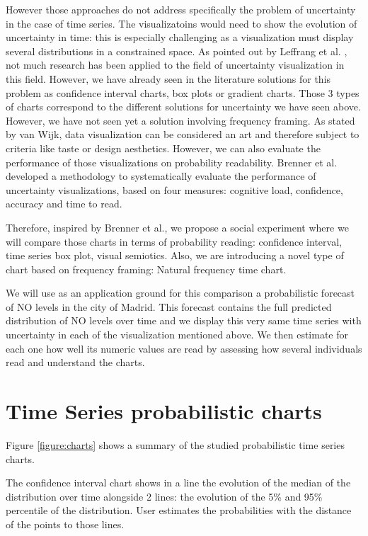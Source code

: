 \documentclass[a4paper,3p,sort&compress]{elsarticle}
\begin{document}
However those approaches do not address specifically the problem of uncertainty in the case of time series.
The visualizatoins would need to show the evolution of uncertainty in time: this 
is especially challenging as a visualization must display several distributions in a constrained space.  
As pointed out by Leffrang et al. \cite{leffrang_should_2021}, not much research has been applied to the 
field of uncertainty visualization in this field. 
However, we have already seen in the literature solutions for this problem as confidence interval charts,
 box plots or gradient charts. Those 3 types of charts correspond to the different solutions for uncertainty 
 we have seen above. However, we have not seen yet a solution involving frequency framing. As stated by van Wijk,
 data visualization can be considered an art and therefore subject to criteria like taste or design aesthetics. 
However, we can also evaluate the performance of those visualizations on probability readability.
Brenner et al. \cite{brennen_instrument_2018} developed a methodology to systematically evaluate the performance
of uncertainty visualizations, based on four measures: cognitive load, confidence, accuracy and time to read. 

Therefore, inspired by Brenner et al., we propose a social experiment where we will compare those charts 
in terms of probability reading: confidence interval, time series box plot, visual semiotics.
Also, we are introducing a novel type of chart based on frequency framing: Natural frequency time chart.

We will use as an application ground for this comparison a probabilistic forecast of NO levels 
in the city of Madrid. This forecast contains the full predicted distribution of NO levels over time
and we display this very same time series with uncertainty in each of the visualization mentioned above. 
We then estimate for each one how well its numeric values are read by assessing how several individuals read 
and understand the charts.

\section{Time Series probabilistic charts} 
\label{sec:time_series}

Figure \ref{figure:charts} shows a summary of the studied probabilistic time series charts.

The confidence interval chart shows in a line the evolution of the median of the distribution
 over time alongside 2 lines: the evolution of the 5\% and 95\% percentile of the distribution. 
 User estimates the probabilities with the distance of the points to those lines.
\end{document}

